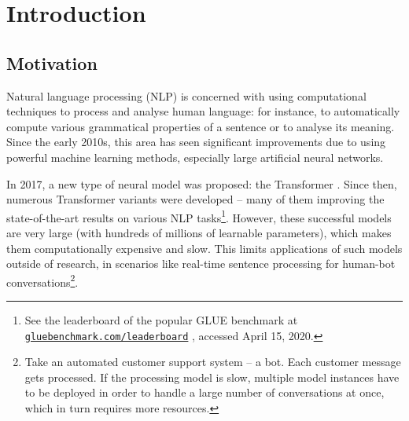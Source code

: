 \documentclass[bsc,frontabs,singlespacing,parskip,deptreport]{infthesis}
\newcommand\rurl[1]{%
  \href{https://#1}{\nolinkurl{#1}}%
}
\begin{document}
\chapter{Introduction}{
  \setcounter{page}{1}
  \section{Motivation}{
    Natural language processing (NLP) is concerned with using computational techniques to process and analyse human language: for instance, to automatically compute various grammatical properties of a sentence or to analyse its meaning.
    Since the early 2010s, this area has seen significant improvements due to using powerful machine learning methods, especially large artificial neural networks.

    In 2017, a new type of neural model was proposed: the Transformer \citep{Vaswani_2017}. Since then, numerous Transformer variants were developed \citep{Radford_2018,Devlin_2018,Lan_2019,Liu_2019,Lample_2019} -- many of them improving the state-of-the-art results on various NLP tasks\footnote{See the leaderboard of the popular GLUE benchmark \citep{Wang_2018} at \rurl{gluebenchmark.com/leaderboard}, accessed April 15, 2020.}.
    However, these successful models are very large (with hundreds of millions of learnable parameters), which makes them computationally expensive and slow. This limits applications of such models outside of research, in scenarios like real-time sentence processing for human-bot conversations\footnote{Take an automated customer support system -- a bot. Each customer message gets processed. If the processing model is slow, multiple model instances have to be deployed in order to handle a large number of conversations at once, which in turn requires more resources.}.

}}
\end{document}
